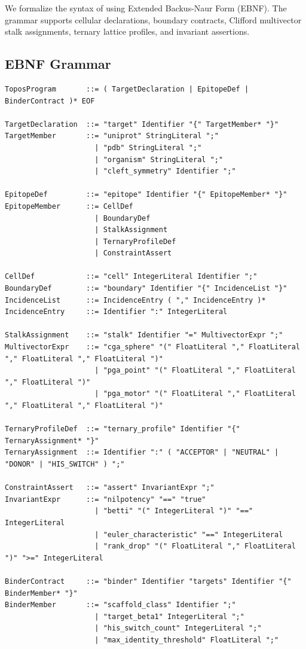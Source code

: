 We formalize the syntax of \ToposLang{} using Extended Backus-Naur Form (EBNF). The grammar supports cellular declarations, boundary contracts, Clifford multivector stalk assignments, ternary lattice profiles, and invariant assertions.

\subsection{EBNF Grammar}
\begin{lstlisting}[language={}]
ToposProgram       ::= ( TargetDeclaration | EpitopeDef | BinderContract )* EOF

TargetDeclaration  ::= "target" Identifier "{" TargetMember* "}"
TargetMember       ::= "uniprot" StringLiteral ";"
                     | "pdb" StringLiteral ";"
                     | "organism" StringLiteral ";"
                     | "cleft_symmetry" Identifier ";"

EpitopeDef         ::= "epitope" Identifier "{" EpitopeMember* "}"
EpitopeMember      ::= CellDef
                     | BoundaryDef
                     | StalkAssignment
                     | TernaryProfileDef
                     | ConstraintAssert

CellDef            ::= "cell" IntegerLiteral Identifier ";"
BoundaryDef        ::= "boundary" Identifier "{" IncidenceList "}"
IncidenceList      ::= IncidenceEntry ( "," IncidenceEntry )*
IncidenceEntry     ::= Identifier ":" IntegerLiteral

StalkAssignment    ::= "stalk" Identifier "=" MultivectorExpr ";"
MultivectorExpr    ::= "cga_sphere" "(" FloatLiteral "," FloatLiteral "," FloatLiteral "," FloatLiteral ")"
                     | "pga_point" "(" FloatLiteral "," FloatLiteral "," FloatLiteral ")"
                     | "pga_motor" "(" FloatLiteral "," FloatLiteral "," FloatLiteral "," FloatLiteral ")"

TernaryProfileDef  ::= "ternary_profile" Identifier "{" TernaryAssignment* "}"
TernaryAssignment  ::= Identifier ":" ( "ACCEPTOR" | "NEUTRAL" | "DONOR" | "HIS_SWITCH" ) ";"

ConstraintAssert   ::= "assert" InvariantExpr ";"
InvariantExpr      ::= "nilpotency" "==" "true"
                     | "betti" "(" IntegerLiteral ")" "==" IntegerLiteral
                     | "euler_characteristic" "==" IntegerLiteral
                     | "rank_drop" "(" FloatLiteral "," FloatLiteral ")" ">=" IntegerLiteral

BinderContract     ::= "binder" Identifier "targets" Identifier "{" BinderMember* "}"
BinderMember       ::= "scaffold_class" Identifier ";"
                     | "target_beta1" IntegerLiteral ";"
                     | "his_switch_count" IntegerLiteral ";"
                     | "max_identity_threshold" FloatLiteral ";"
\end{lstlisting}

